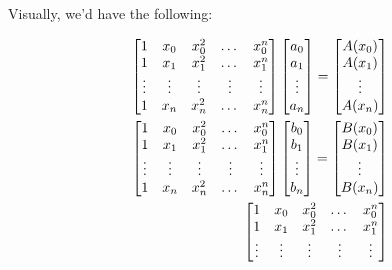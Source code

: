 \begin{enumerate}
{Visually, we'd have the following:

\begin{align*}
  \begin{bmatrix}
    1 & x_{0} & x_{0}^{2} & \dots & x_{0}^{n} \\
    1 & x_{1} & x_{1}^{2} & \dots & x_{1}^{n} \\
    \vdots & \vdots & \vdots & \vdots & \vdots \\
    1 & x_{n} & x_{n}^{2} & \dots & x_{n}^{n}
  \end{bmatrix}
  \begin{bmatrix}
    a_{0} \\
    a_{1} \\
    \vdots \\
    a_{n}
  \end{bmatrix}
  = \begin{bmatrix}
    A(x_{0}) \\
    A(x_{1}) \\
    \vdots \\
    A(x_{n})
  \end{bmatrix} \\
  \begin{bmatrix}
    1 & x_{0} & x_{0}^{2} & \dots & x_{0}^{n} \\
    1 & x_{1} & x_{1}^{2} & \dots & x_{1}^{n} \\
    \vdots & \vdots & \vdots & \vdots & \vdots \\
    1 & x_{n} & x_{n}^{2} & \dots & x_{n}^{n}
  \end{bmatrix}
  \vspace{2mm}
  \begin{bmatrix}
    b_{0} \\
    b_{1} \\
    \vdots \\
    b_{n}
  \end{bmatrix}
  = \begin{bmatrix}
    B(x_{0}) \\
    B(x_{1}) \\
    \vdots \\
    B(x_{n})
  \end{bmatrix} \\
  \vspace{2mm}
  \begin{bmatrix}
    1 & x_{0} & x_{0}^{2} & \dots & x_{0}^{n} \\
    1 & x_{1} & x_{1}^{2} & \dots & x_{1}^{n} \\
    \vdots & \vdots & \vdots & \vdots & \vdots \\

\end{bmatrix}
\end{align*}}
\end{enumerate}
